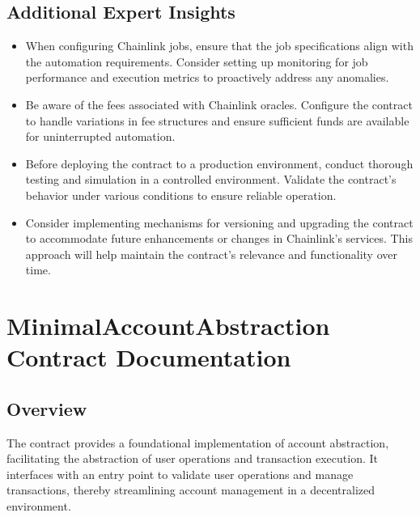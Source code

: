 \documentclass[letterpaper,10pt,english]{sphinxmanual}
\begin{document}
\section{Additional Expert Insights}
\label{\detokenize{docs_chainlink_automation_contract:additional-expert-insights}}\begin{itemize}
\item {} 
\sphinxAtStartPar
{}
When configuring Chainlink jobs, ensure that the job specifications align with the automation requirements. Consider setting up monitoring for job performance and execution metrics to proactively address any anomalies.

\item {} 
\sphinxAtStartPar
{}
Be aware of the fees associated with Chainlink oracles. Configure the contract to handle variations in fee structures and ensure sufficient funds are available for uninterrupted automation.

\item {} 
\sphinxAtStartPar
{}
Before deploying the  contract to a production environment, conduct thorough testing and simulation in a controlled environment. Validate the contract’s behavior under various conditions to ensure reliable operation.

\item {} 
\sphinxAtStartPar
{}
Consider implementing mechanisms for versioning and upgrading the contract to accommodate future enhancements or changes in Chainlink’s services. This approach will help maintain the contract’s relevance and functionality over time.

\end{itemize}

\sphinxAtStartPar
{\color{red}\bfseries{}\textasciigrave{}\textasciigrave{}}{\color{red}\bfseries{}\textasciigrave{}}

\sphinxstepscope


\chapter{MinimalAccountAbstraction Contract Documentation}
\label{\detokenize{docs_minimal_account_abstraction:minimalaccountabstraction-contract-documentation}}\label{\detokenize{docs_minimal_account_abstraction::doc}}

\section{Overview}
\label{\detokenize{docs_minimal_account_abstraction:overview}}
\sphinxAtStartPar
The  contract provides a foundational implementation of account abstraction, facilitating the abstraction of user operations and transaction execution. It interfaces with an entry point to validate user operations and manage transactions, thereby streamlining account management in a decentralized environment.
\end{document}
